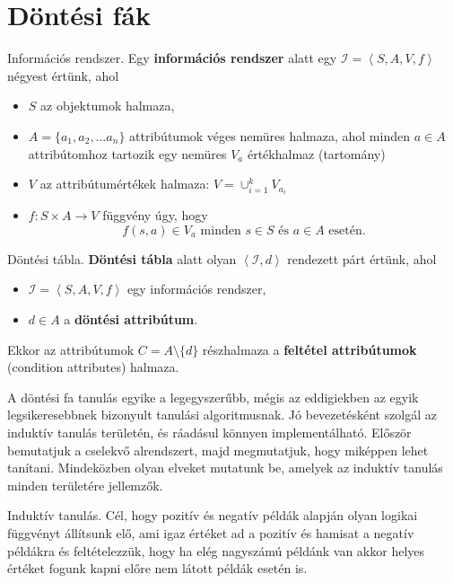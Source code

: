 \section{Döntési fák}

\begin{definicio}
    Információs rendszer.
    Egy {\bf információs rendszer} alatt egy $\mathcal{I} = \left<S, A, V, f \right>$
    négyest értünk, ahol
    \begin{itemize}
        \item $S$ az objektumok halmaza,
        \item $A = \{a_1, a_2, \ldots a_n\}$ attribútumok véges nemüres
            halmaza, ahol minden $a \in A$ attribútomhoz tartozik egy nemüres
            $V_a$ értékhalmaz (tartomány)
        \item $V$ az attribútumértékek halmaza: $V = \cup^k_{i=1} V_{a_i}$
        \item $f: S \times A \to V$ függvény úgy, hogy \[
                f(s, a) \in V_a \text{ minden } s \in S \text{ és }
                a \in A \text{ esetén}
        .\]
    \end{itemize}
\end{definicio}

\begin{definicio}
    Döntési tábla.
    {\bf Döntési tábla} alatt olyan $\left<\mathcal{I}, d \right>$
    rendezett párt értünk, ahol
    \begin{itemize}
        \item $\mathcal{I} = \left<S, A, V, f \right>$ egy információs
            rendszer,
        \item $d\in A$ a {\bf döntési attribútum}.
    \end{itemize}

    Ekkor az attribútumok $C = A \setminus \{d\}$ részhalmaza a {\bf feltétel
    attribútumok} (condition attributes) halmaza.
\end{definicio}

A döntési fa tanulás egyike a legegyszerűbb, mégis az eddigiekben az egyik
legsikeresebbnek bizonyult tanulási algoritmusnak. Jó bevezetésként szolgál az
induktív tanulás területén, és ráadásul könnyen implementálható. Először
bemutatjuk a cselekvő alrendszert, majd megmutatjuk, hogy miképpen lehet
tanítani. Mindeközben olyan elveket mutatunk be, amelyek az induktív tanulás
minden területére jellemzők.

\begin{definicio}
    Induktív tanulás.
    Cél, hogy pozitív és negatív példák alapján olyan logikai függvényt
    állítsunk elő, ami igaz értéket ad a pozitív és hamisat a negatív példákra
    és feltételezzük, hogy ha elég nagyszámú példánk van akkor helyes értéket
    fogunk kapni előre nem látott példák esetén is.
\end{definicio}

